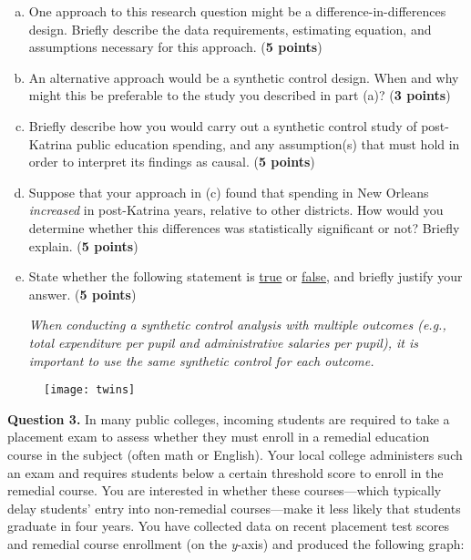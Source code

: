 \documentclass[12pt]{article}
\begin{document}
\begin{enumerate}[(a)]
\setlength\itemsep{1em}
\item One approach to this research question might be a difference-in-differences design. Briefly describe the data requirements, estimating equation, and assumptions necessary for this approach. ({\bf 5 points})

\item An alternative approach would be a synthetic control design. When and why might this be preferable to the study you described in part (a)? ({\bf 3 points})

\item Briefly describe how you would carry out a synthetic control study of post-Katrina public education spending, and any assumption(s) that must hold in order to interpret its findings as causal. ({\bf 5 points})

\item Suppose that your approach in (c) found that spending in New Orleans \textit{increased} in post-Katrina years, relative to other districts. How would you determine whether this differences was statistically significant or not? Briefly explain. ({\bf 5 points})

\item State whether the following statement is \underline{true} or \underline{false}, and briefly justify your answer. ({\bf 5 points})

\textit{When conducting a synthetic control analysis with multiple outcomes (e.g., total expenditure per pupil and administrative salaries per pupil), it is important to use the same synthetic control for each outcome.}

\end{enumerate}

\begin{figure}[h!]
\begin{center}
\texttt{[image: twins]} 
\end{center}
\end{figure}
\pagebreak


\textbf{Question 3.} In many public colleges, incoming students are required to take a placement exam to assess whether they must enroll in a remedial education course in the subject (often math or English). Your local college administers such an exam and requires students below a certain threshold score to enroll in the remedial course. You are interested in whether these courses---which typically delay students' entry into non-remedial courses---make it less likely that students graduate in four years. You have collected data on recent placement test scores and remedial course enrollment (on the \textit{y}-axis) and produced the following graph:
\end{document}
